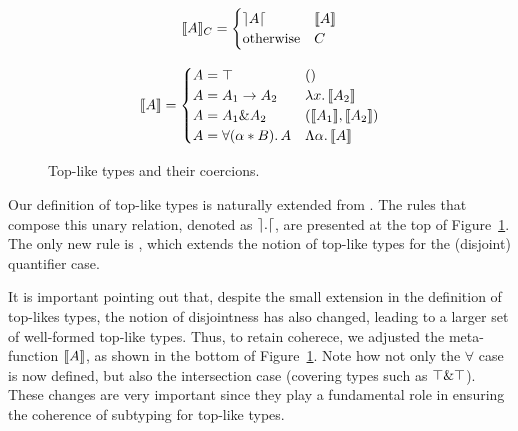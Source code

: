 \begin{figure}[!t]



  \[
  \llbracket A \rrbracket_{C} = 
  \begin{cases} 
        \rceil A \lceil & \llbracket A \rrbracket \\ 
        \text{otherwise} & {C} 
  \end{cases}
  \]


  \[
  \llbracket A \rrbracket = 
  \begin{cases} 
        A = \top & () \\
        A = A_1 \to A_2 & \lambda x.\, \llbracket A_2 \rrbracket \\
        A = A_1 \& A_2 & (\llbracket A_1 \rrbracket, \llbracket A_2 \rrbracket) \\
        A = \forall (\alpha * B).\, A & \Lambda \alpha.\, \llbracket A \rrbracket
  \end{cases}
  \]
  \caption{Top-like types and their coercions.}
  \label{fig:andcoercion}
\end{figure}

Our definition of top-like types is naturally extended from \oldname. 
The rules that compose this unary relation, denoted as $\rceil  .  \lceil$, are presented at the top of 
Figure~\ref{fig:andcoercion}. 
The only new rule is , which extends the notion of top-like types for
the (disjoint) quantifier case.

It is important pointing out that, despite the small extension in the definition of top-likes types,  
the notion of disjointness has also changed, leading to a larger set of well-formed top-like types.
Thus, to retain coherece, we adjusted the meta-function $\llbracket A \rrbracket$, as shown in the bottom of 
Figure~\ref{fig:andcoercion}.
Note how not only the $\forall$ case is now defined, but also the intersection case (covering types such
as $\top \& \top$).
These changes are very important since they play a fundamental role in ensuring the coherence of subtyping for top-like
types.

